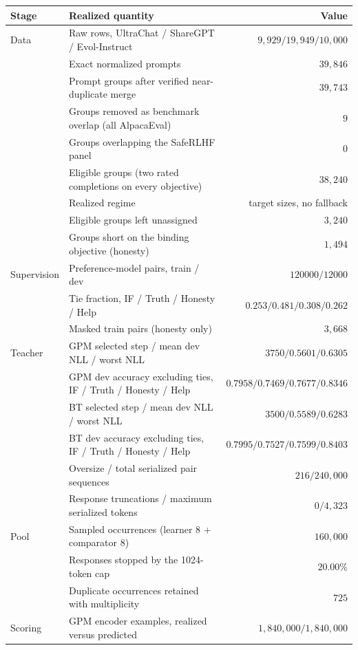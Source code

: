 \begin{tabular}{p{2.9cm}p{6.0cm}r}
\toprule
Stage & Realized quantity & Value\\
\midrule
Data & Raw rows, UltraChat / ShareGPT / Evol-Instruct & $9{,}929 / 19{,}949 / 10{,}000$\\
 & Exact normalized prompts & $39{,}846$\\
 & Prompt groups after verified near-duplicate merge & $39{,}743$\\
 & Groups removed as benchmark overlap (all AlpacaEval) & $9$\\
 & Groups overlapping the SafeRLHF panel & $0$\\
 & Eligible groups (two rated completions on every objective) & $38{,}240$\\
 & Realized regime & \textrm{target sizes, no fallback}\\
 & Eligible groups left unassigned & $3{,}240$\\
 & Groups short on the binding objective (honesty) & $1{,}494$\\
Supervision & Preference-model pairs, train / dev & $120000 / 12000$\\
 & Tie fraction, IF / Truth / Honesty / Help & $0.253 / 0.481 / 0.308 / 0.262$\\
 & Masked train pairs (honesty only) & $3{,}668$\\
Teacher & GPM selected step / mean dev NLL / worst NLL & $3750 / 0.5601 / 0.6305$\\
 & GPM dev accuracy excluding ties, IF / Truth / Honesty / Help & $0.7958 / 0.7469 / 0.7677 / 0.8346$\\
 & BT selected step / mean dev NLL / worst NLL & $3500 / 0.5589 / 0.6283$\\
 & BT dev accuracy excluding ties, IF / Truth / Honesty / Help & $0.7995 / 0.7527 / 0.7599 / 0.8403$\\
 & Oversize / total serialized pair sequences & $216 / 240{,}000$\\
 & Response truncations / maximum serialized tokens & $0 / 4{,}323$\\
Pool & Sampled occurrences (learner 8 + comparator 8) & $160{,}000$\\
 & Responses stopped by the 1024-token cap & $20.00\%$\\
 & Duplicate occurrences retained with multiplicity & $725$\\
Scoring & GPM encoder examples, realized versus predicted & $1{,}840{,}000 / 1{,}840{,}000$\\

\end{tabular}
